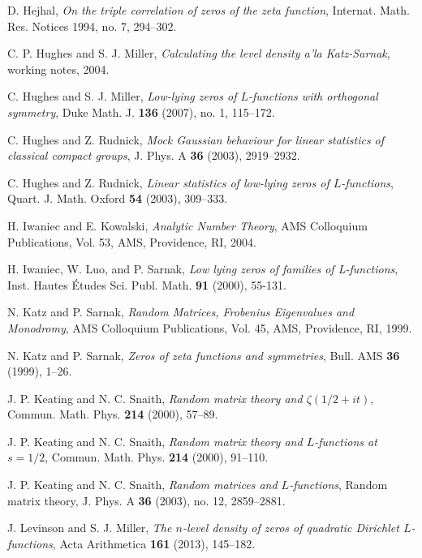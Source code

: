 \documentclass[12pt, reqno]{amsart}
\numberwithin{equation}{section}
\theoremstyle{definition}
\theoremstyle{remark}
\begin{document}
\begin{thebibliography}{FMGGGG15}
\newblock D. Hejhal, \emph{On the triple correlation of zeros of
the zeta function}, Internat. Math. Res. Notices 1994, no. 7,
294--302.

C. P. Hughes and S. J. Miller, \emph{Calculating the level density a'la Katz-Sarnak}, working notes, 2004.

\newblock C. Hughes and S. J. Miller, \emph{Low-lying zeros of $L$-functions
with orthogonal symmetry}, Duke Math. J.
\textbf{136} (2007), no. 1, 115--172.

\newblock C. Hughes and Z. Rudnick, \emph{Mock Gaussian behaviour for linear statistics of classical
compact groups}, J. Phys. A \textbf{36} (2003), 2919--2932.

\newblock C. Hughes and Z. Rudnick, \emph{Linear statistics of
low-lying zeros of $L$-functions}, Quart. J. Math. Oxford
\textbf{54} (2003), 309--333.

H. Iwaniec and E. Kowalski, \emph{Analytic Number Theory}, AMS
Colloquium Publications, Vol. 53, AMS, Providence, RI, 2004.

H. Iwaniec, W. Luo, and P. Sarnak, \emph{Low lying zeros of families of L-functions}, Inst. Hautes \'Etudes Sci. Publ. Math. \textbf{91} (2000), 55-131.

N. Katz and P. Sarnak, \emph{Random Matrices, Frobenius Eigenvalues and Monodromy}, AMS Colloquium Publications, Vol. 45, AMS,
Providence, RI, 1999.

N. Katz and P. Sarnak, \emph{Zeros of zeta functions and
symmetries}, Bull. AMS \textbf{36} (1999), 1--26.

J. P. Keating and N. C. Snaith, \emph{Random matrix theory and $\zeta(1/2+it)$}, Commun. Math. Phys. \textbf{214} (2000), 57--89.

J. P. Keating and N. C. Snaith, \emph{Random matrix theory and $L$-functions at $s=1/2$}, Commun. Math. Phys.  \textbf{214} (2000), 91--110.

\newblock J. P. Keating and N. C. Snaith, \emph{Random
matrices and $L$-functions}, Random matrix theory, J. Phys. A
\textbf{36} (2003), no. 12, 2859--2881.

J. Levinson and S. J. Miller, \emph{The $n$-level density of zeros of quadratic Dirichlet $L$-functions}, Acta Arithmetica \textbf{161} (2013), 145--182.


\end{thebibliography}
\end{document}
